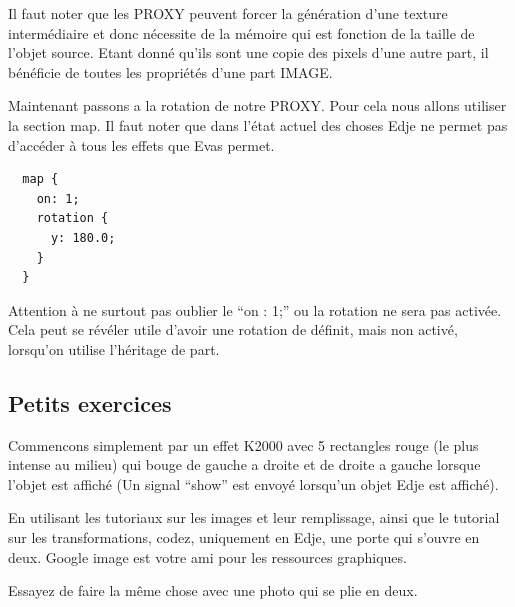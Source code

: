 \documentclass[a4paper]{efr}
\begin{document}
Il faut noter que les PROXY peuvent forcer la génération d'une texture intermédiaire et
donc nécessite de la mémoire qui est fonction de la taille de l'objet source. Etant donné
qu'ils sont une copie des pixels d'une autre part, il bénéficie de toutes les propriétés
d'une part IMAGE.

Maintenant passons a la rotation de notre PROXY. Pour cela nous allons utiliser la
section map. Il faut noter que dans l'état actuel des choses Edje ne permet pas d'accéder
à tous les effets que Evas permet.

\begin{lstlisting}
  map {
    on: 1;
    rotation {
      y: 180.0;
    }
  }
\end{lstlisting}

Attention à ne surtout pas oublier le ``on : 1;'' ou la rotation ne sera pas activée.
Cela peut se révéler utile d'avoir une rotation de définit, mais non activé, lorsqu'on
utilise l'héritage de part.

\subsection{Petits exercices}

Commencons simplement par un effet K2000 avec 5 rectangles rouge (le plus intense au milieu)
qui bouge de gauche a droite et de droite a gauche lorsque l'objet est affiché (Un signal
``show'' est envoyé lorsqu'un objet Edje est affiché).

En utilisant les tutoriaux sur les images et leur remplissage, ainsi que le tutorial
sur les transformations, codez, uniquement en Edje, une porte qui s'ouvre en deux. Google
image est votre ami pour les ressources graphiques.

Essayez de faire la même chose avec une photo qui se plie en deux.
\end{document}
